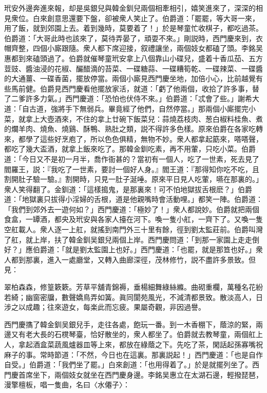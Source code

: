玳安外邊奔進來報，却是吳銀兒與韓金釧兒兩個相牽相引，嬉笑進來了，深深的相見衆位。白來創意思還要下盤，卻被衆人笑止了。伯爵道：「罷罷，等大哥一來，用了飯，就到郊園上去。着到幾時，莫要着了！」於是琴童忙收棋子，都吃過茶。伯爵道：「大哥此時也該來了，莫待弄晏了，頑耍不來。」剛説時，西門慶來到，衣帽齊整，四個小廝跟隨。衆人都下席迎接，叙禮讓坐，兩個妓女都磕了頭。李銘吴惠都到來磕頭過了。伯爵就催琴童玳安拿上八個靠山小碟兒，盛着十香瓜茄、五方荳豉、醬油浸的花椒、釅醋滴的苔菜、一碟糖蒜、一碟糟筍乾、一碟辣菜、一碟醬的大通薑、一碟香菌，擺放停當。兩個小廝見西門慶坐地，加倍小心，比前越覺有些馬前健。伯爵見西門慶看他擺放家活，就道：「虧了他兩個，收拾了許多事，替了二爹許多力氣。」西門慶道：「恐怕也伏侍不來。」伯爵道：「忒會了些。」謝希大道：「自古道，強將手下無弱兵。畢竟經了他們，自然停當。」那兩個小廝擺完小菜，就拿上大壺酒來，不住的拿上廿碗下飯菜兒：蒜燒荔枝肉、葱白椒料桂魚、煮的爛羊肉、燒魚、燒鷄、酥鴨、熟肚之類，説不得許多色樣。原來伯爵在各家吃轉來，都學了這些好烹庖了，所以色色俱精，無物不妙。衆人都拿起筯來，嗒嗒聲，都吃了幾大盃酒，就拿上飯來吃了。那韓金釧吃素，再不用葷，只吃小菜。伯爵道：「今日又不是初一月半，喬作衙甚的？當初有一個人，吃了一世素，死去見了閻羅王，説：『我吃了一世素，要討一個好人身。』閻王道：『那得知你吃不吃，且割開肚子驗一驗。』割開時，只見一肚子涎唾。原來平日見人吃葷，嚥在那裏的。」衆人笑得翻了。金釧道：「這樣搗鬼，是那裏來！可不怕地獄拔舌根麽？」伯爵道：「地獄裏只拔得小淫婦的舌根，道是他親嘴時會活動哩。」都笑一陣。伯爵道：「我們到郊外去一遊何如？」西門慶道：「極妙了！」衆人都說妙。伯爵就把兩個食盒，一罈酒，都央及玳安與各家人擡在河下。喚一隻小舡，一齊下了。又喚一隻空舡載人。衆人逐一上舡，就搖到南門外三十里有餘，徑到劉太監莊前。伯爵叫灣了舡，就上岸，扶了韓金釧吴銀兒兩個上岸。西門慶問道：「到那一家園上走走倒好？」應伯爵道：「就是劉太監園上也好。」西門慶道：「也罷，就是那笪也好。」衆人都到那裏，進入一處廳堂，又轉入曲廊深徑，茂林修竹，説不盡許多景致。但見：

\begin{myquote}
翠柏森森，修篁簌簌。芳草平舖青錦褥，垂楊細舞綠絲縧。曲砌重欄，萬種名花紛若綺；幽窗密牖，數聲嬌鳥弄如簧。眞同閬苑風光，不減清都景致。散淡高人，日涉之以成趣；往來遊女，每楽此而忘疲。果屬奇觀，非因過譽。
\end{myquote}

西門慶㩦了韓金釧吴銀兒手，走往各處，飽玩一番。到一木香棚下，蔭涼的緊，兩邊又有老大長的石櫈琴臺，恰好散坐的，衆人都坐了。伯爵就去教琴童，兩個舡上人，拿起酒盒菜蔬風爐器皿等上來，都放在綠蔭之下。先吃了茶，閑話起孫寡嘴祝麻子的事。常時節道：「不然，今日也在這裏。那裏説起！」西門慶道：「也是自作自受。」伯爵道：「我們坐了罷。」白來創道：「也用得着了。」於是就擺列坐了。西門慶首席坐下，兩個妓女就坐在西門慶身邊。李銘吴惠立在太湖石邊，輕撥琵琶，漫擎檀板，唱一隻曲，名曰〈水僊子〉：

